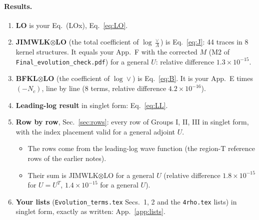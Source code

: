 \documentclass[10pt]{article}
\numberwithin{equation}{section}
\begin{document}
\paragraph{Results.}
\begin{enumerate}
\item \textbf{LO} is your Eq.~(LOx), Eq.~\eqref{eq:LO}.
\item \textbf{JIMWLK$\otimes$LO} (the total coefficient of $\log\frac{\vee}{\Lambda}$) is Eq.~\eqref{eq:J}: 44 traces in 8 kernel structures. It equals your App.~F with the corrected $M$ (M2 of \texttt{Final\_evolution\_check.pdf}) for a general $U$: relative difference $1.3\times10^{-15}$.
\item \textbf{BFKL$\otimes$LO} (the coefficient of $\log\vee$) is Eq.~\eqref{eq:B}. It is your App.~E times $(-N_c)$, line by line (8 terms, relative difference $4.2\times10^{-16}$).
\item \textbf{Leading-log result} in singlet form: Eq.~\eqref{eq:LL}.
\item \textbf{Row by row}, Sec.~\ref{sec:rows}: every row of Groups I, II, III in singlet form, with the index placement valid for a general adjoint $U$.
\begin{itemize}
\item The rows come from the leading-log wave function (the region-T reference rows of the earlier notes).
\item Their sum is JIMWLK$\otimes$LO for a general $U$ (relative difference $1.8\times10^{-15}$ for $U=U^T$, $1.4\times10^{-15}$ for a general $U$).
\end{itemize}
\item \textbf{Your lists} (\texttt{Evolution\_terms.tex} Secs.~1, 2 and the \texttt{4rho.tex} lists) in singlet form, exactly as written: App.~\ref{app:lists}.
\end{enumerate}
\end{document}
